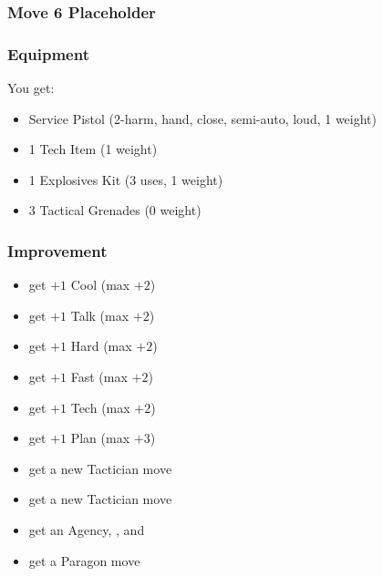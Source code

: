 

\subsubsection{Move 6 Placeholder} %

\subsubsection{Equipment}
You get:
\begin{itemize}
\item Service Pistol (2-harm, hand, close, semi-auto, loud, 1 weight) 
\item 1 Tech Item (1 weight)
\item 1 Explosives Kit (3 uses, 1 weight)
\item 3 Tactical Grenades (0 weight)
\end{itemize}

\subsubsection{Improvement}
\begin{itemize}
\item get $+1$ Cool (max $+2$)
\item get $+1$ Talk (max $+2$)
\item get $+1$ Hard (max $+2$)
\item get $+1$ Fast (max $+2$)
\item get $+1$ Tech (max $+2$)
\item get $+1$ Plan (max $+3$)
\item get a new Tactician move
\item get a new Tactician move
\item get an Agency, , and 
\item get a Paragon move
\end{itemize}